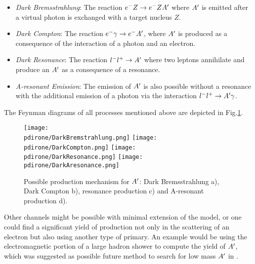 \begin{itemize}
\item \textit{Dark Bremsstrahlung}: The reaction $e^- Z \to e^- Z A'$ where $A'$ is emitted after a virtual photon is exchanged with a target nucleus $Z$.
\item \textit{Dark Compton}: The reaction $e^- \gamma \to e^- A'$, where $A'$ is produced as a consequence of the interaction of a photon and an electron.
\item \textit{Dark Resonance}: The reaction $l^- l^+ \to A'$ where two leptons annihilate and produce an $A'$ as a consequence of a resonance.
\item \textit{A-resonant Emission}: The emission of $A'$ is also possible without a resonance with the additional emission of a photon via the interaction $l^- l^+ \to A' \gamma$.
\end{itemize}

The Feynman diagrams of all processes mentioned above are depicted in Fig.\ref{fig:dm-production-mechanism}.

\begin{figure}
\centering
\texttt{[image: \\pdirone/DarkBremstrahlung.png]}
\texttt{[image: \\pdirone/DarkCompton.png]}
\texttt{[image: \\pdirone/DarkResonance.png]}
\texttt{[image: \\pdirone/DarkAresonance.png]}
\caption{Possible production mechanism for $A'$: Dark Bremsstrahlung a), Dark Compton b), resonance production c) and A-resonant production d).}
\label{fig:dm-production-mechanism}
\end{figure}

Other channels might be possible with minimal extension of the model, or one could find a significant yield of production not only in the scattering of an electron but also using another type of primary. An example would be using the electromagnetic portion of a large hadron shower to compute the yield of $A'$, which was suggested as possible future method to search for low mass $A'$ in \cite{Celentano:2020vtu}.

